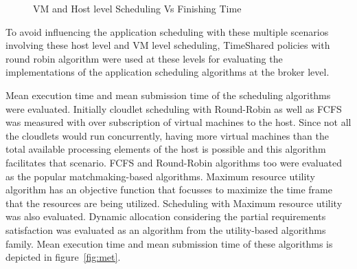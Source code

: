 \documentclass[times, 10pt,twocolumn]{article}
\begin{document}
\begin{figure}[ht]
 \caption{VM and Host level Scheduling Vs Finishing Time}
 \label{fig:finish}
\end{figure}

To avoid influencing the application scheduling with these multiple scenarios involving these host level and VM level scheduling, TimeShared policies with round robin algorithm were used at these levels for evaluating the implementations of the application scheduling algorithms at the broker level. 

Mean execution time and mean submission time of the scheduling algorithms were evaluated. Initially cloudlet scheduling with Round-Robin as well as FCFS was measured with over subscription of virtual machines to the host. Since not all the cloudlets would run concurrently, having more virtual machines than the total available processing elements of the host is possible and this algorithm facilitates that scenario. FCFS and Round-Robin algorithms too were evaluated as the popular matchmaking-based algorithms. Maximum resource utility algorithm has an objective function that focusses to maximize the time frame that the resources are being utilized. Scheduling with Maximum resource utility was also evaluated. Dynamic allocation considering the partial requirements satisfaction was evaluated as an algorithm from the utility-based algorithms family. Mean execution time and mean submission time of these algorithms is depicted in figure~\ref{fig:met}.
\end{document}
